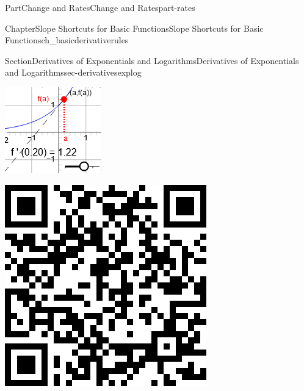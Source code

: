 \documentclass[oneside,10pt,]{tufte-book}
\numberwithin{equation}{chapter}
\begin{document}
\begin{partptx}{Part}{Change and Rates}{}{Change and Rates}{}{}{part-rates}
\begin{chapterptx}{Chapter}{Slope Shortcuts for Basic Functions}{}{Slope Shortcuts for Basic Functions}{}{}{ch_basicderivativerules}
\begin{sectionptx}{Section}{Derivatives of Exponentials and Logarithms}{}{Derivatives of Exponentials and Logarithms}{}{}{sec-derivativesexplog}
\begin{sidebyside}{2}{0.075}{0.075}{0.17}
\begin{sbspanel}{0.47}
\includegraphics[width=\linewidth]{external/jsxgraph-findingslopefromtangent-exercise2c.png}
\end{sbspanel}%
\begin{sbspanel}{0.21}%
\includegraphics[width=\linewidth]{generated/qrcode/sec-derivativesexplog-4-3.png}

\end{sbspanel}
\end{sidebyside}
\end{sectionptx}
\end{chapterptx}
\end{partptx}
\end{document}
